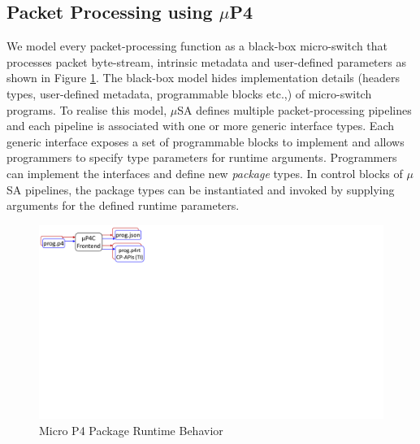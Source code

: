 \subsection{Packet Processing using $\mu$P4}
\label{subsection:packet-processing-using-mp4}
We model every packet-processing function as a black-box micro-switch that processes packet byte-stream, intrinsic metadata and user-defined parameters as shown in Figure \ref{fig:package-runtime-behavior}.
The black-box model hides implementation details (headers types, user-defined metadata, programmable blocks etc.,) of micro-switch programs.
To realise this model, $\mu$SA defines multiple packet-processing pipelines and each pipeline is associated with one or more generic interface types.
Each generic interface exposes a set of programmable blocks to implement and allows programmers to specify type parameters for runtime arguments.
Programmers can implement the interfaces and define new \emph{package} types.
In control blocks of $\mu$SA pipelines, the package types can be instantiated and invoked by supplying arguments for the defined runtime parameters. 
\begin{figure}[!h]
    \centering
    \includegraphics[trim=300 300 0 0, clip,scale=0.2]{mp4c-frontend}
    \caption{Micro P4 Package Runtime Behavior}
    \label{fig:package-runtime-behavior}
\end{figure}


